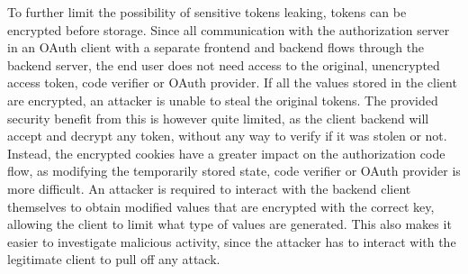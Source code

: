 To further limit the possibility of sensitive tokens leaking, tokens can be encrypted before storage.
Since all communication with the authorization server in an OAuth client with a separate frontend and backend flows through the backend server, the end user does not need access to the original, unencrypted access token, code verifier or OAuth provider.
If all the values stored in the client are encrypted, an attacker is unable to steal the original tokens.
The provided security benefit from this is however quite limited, as the client backend will accept and decrypt any token, without any way to verify if it was stolen or not.
Instead, the encrypted cookies have a greater impact on the authorization code flow, as modifying the temporarily stored state, code verifier or OAuth provider is more difficult.
An attacker is required to interact with the backend client themselves to obtain modified values that are encrypted with the correct key, allowing the client to limit what type of values are generated.
This also makes it easier to investigate malicious activity, since the attacker has to interact with the legitimate client to pull off any attack.